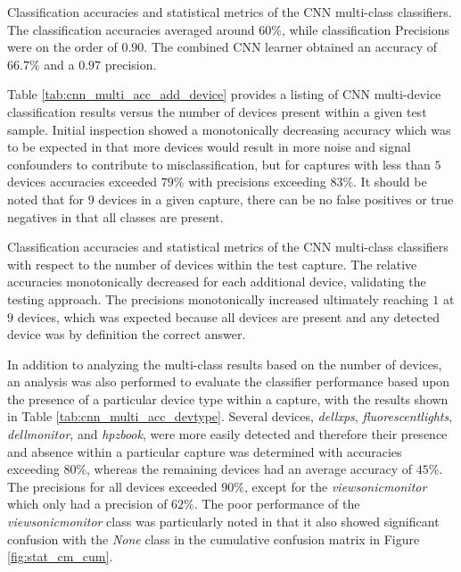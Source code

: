 \begin{table}[tb]
	\caption{Classification accuracies and statistical metrics of the CNN multi-class classifiers.  The classification accuracies averaged around $60\%$, while classification Precisions were on the order of $0.90$. The combined CNN learner obtained an accuracy of $66.7\%$ and a $0.97$ precision.}
	\centering
	\label{tab:cnn_multi_testrmvd}
\end{table}
 
Table \ref{tab:cnn_multi_acc_add_device} provides a listing of CNN multi-device classification results versus the number of devices present within a given test sample.  Initial inspection showed a monotonically decreasing accuracy which was to be expected in that more devices would result in more noise and signal confounders to contribute to misclassification, but for captures with less than $5$ devices accuracies exceeded $79\%$ with precisions exceeding $83\%$.  It should be noted that for $9$ devices in a given capture, there can be no false positives or true negatives in that all classes are present.  

\begin{table}[tb]
	\caption{Classification accuracies and statistical metrics of the CNN multi-class classifiers with respect to the number of devices within the test capture.  The relative accuracies monotonically decreased for each additional device, validating the testing approach.  The precisions monotonically increased ultimately reaching $1$ at $9$ devices, which was expected because all devices are present and any detected device was by definition the correct answer.}
	\centering
	\label{tab:cnn_multi_acc_add_device}
\end{table}

In addition to analyzing the multi-class results based on the number of devices, an analysis was also performed to evaluate the classifier performance based upon the presence of a particular device type within a capture, with the results shown in Table \ref{tab:cnn_multi_acc_devtype}.  Several devices, \textit{dellxps}, \textit{fluorescentlights}, \textit{dellmonitor}, and \textit{hpzbook}, were more easily detected and therefore their presence and absence within a particular capture was determined with accuracies exceeding $80\%$, whereas the remaining devices had an average accuracy of $45\%$.  The precisions for all devices exceeded $90\%$, except for the \textit{viewsonicmonitor} which only had a precision of $62\%$.  The poor performance of the \textit{viewsonicmonitor} class was particularly noted in that it also showed significant confusion with the \textit{None} class in the cumulative confusion matrix in Figure \ref{fig:stat_cm_cum}.  

